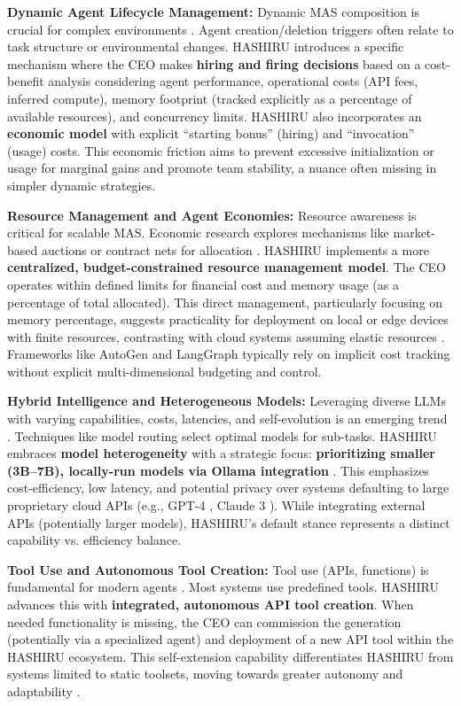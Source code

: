 \documentclass[conference]{IEEEtran}
\begin{document}
\textbf{Dynamic Agent Lifecycle Management:}
Dynamic MAS composition is crucial for complex environments \cite{valckenaers2005trends}. Agent creation/deletion triggers often relate to task structure or environmental changes. HASHIRU introduces a specific mechanism where the CEO makes \textbf{hiring and firing decisions} based on a cost-benefit analysis considering agent performance, operational costs (API fees, inferred compute), memory footprint (tracked explicitly as a percentage of available resources), and concurrency limits. HASHIRU also incorporates an \textbf{economic model} with explicit ``starting bonus'' (hiring) and ``invocation'' (usage) costs. This economic friction aims to prevent excessive initialization or usage for marginal gains and promote team stability, a nuance often missing in simpler dynamic strategies.

\textbf{Resource Management and Agent Economies:}
Resource awareness is critical for scalable MAS. Economic research explores mechanisms like market-based auctions or contract nets for allocation \cite{clearwater1996market}. HASHIRU implements a more \textbf{centralized, budget-constrained resource management model}. The CEO operates within defined limits for financial cost and memory usage (as a percentage of total allocated). This direct management, particularly focusing on memory percentage, suggests practicality for deployment on local or edge devices with finite resources, contrasting with cloud systems assuming elastic resources \cite{park2023generative}. Frameworks like AutoGen \cite{wu2023autogen} and LangGraph \cite{langgraph} typically rely on implicit cost tracking without explicit multi-dimensional budgeting and control.

\textbf{Hybrid Intelligence and Heterogeneous Models:}
Leveraging diverse LLMs with varying capabilities, costs, latencies, and self-evolution is an emerging trend \cite{zhou2023agents,liang2024self}. Techniques like model routing select optimal models for sub-tasks. HASHIRU embraces \textbf{model heterogeneity} with a strategic focus: \textbf{prioritizing smaller (3B--7B), locally-run models via Ollama integration} \cite{ollama}. This emphasizes cost-efficiency, low latency, and potential privacy over systems defaulting to large proprietary cloud APIs (e.g., GPT-4 \cite{openai2023gpt4}, Claude 3 \cite{anthropic2024claude}). While integrating external APIs (potentially larger models), HASHIRU's default stance represents a distinct capability vs. efficiency balance.

\textbf{Tool Use and Autonomous Tool Creation:}
Tool use (APIs, functions) is fundamental for modern agents \cite{yao2022react, openai_func_calling}. Most systems use predefined tools. HASHIRU advances this with \textbf{integrated, autonomous API tool creation}. When needed functionality is missing, the CEO can commission the generation (potentially via a specialized agent) and deployment of a new API tool within the HASHIRU ecosystem. This self-extension capability differentiates HASHIRU from systems limited to static toolsets, moving towards greater autonomy and adaptability \cite{wang2023voyager, park2023generative}.
\end{document}
